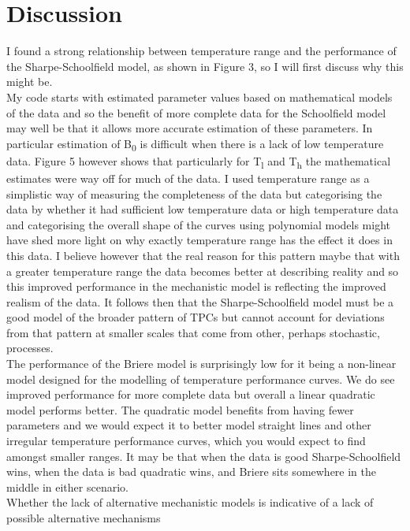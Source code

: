 \documentclass[fontsize=11pt]{scrartcl}\usepackage[]{graphicx}\usepackage[]{color}
\begin{document}
  \section{Discussion}

  I found a strong relationship between temperature range and the performance of the Sharpe-Schoolfield model, 
  as shown in Figure 3, so I will first discuss why this might be. \\
  My code starts with estimated parameter values based on mathematical models of the data and 
  so the benefit of more complete data for the Schoolfield model may well be that it allows more 
  accurate estimation of these parameters. In particular estimation of B\textsubscript{0} is 
  difficult when there is a lack of low temperature data.  Figure 5 however shows that particularly for T\textsubscript{l} 
  and T\textsubscript{h} the mathematical estimates were way off for much of the data. I used temperature range as a simplistic way of measuring
  the completeness of the data but categorising the data by whether it had sufficient low temperature data or high temperature data 
  and categorising the overall shape of the curves using polynomial models might have shed more light on why exactly temperature 
  range has the effect it does in this data. I believe however that the real reason for this pattern maybe that with a greater temperature
  range the data becomes better at describing reality and so this improved performance in the mechanistic model is reflecting the
  improved realism of the data. It follows then that the Sharpe-Schoolfield model must be a good model of the broader pattern of 
  TPCs but cannot account for deviations from that pattern at smaller scales that come from other, perhaps stochastic, processes. \\
  The performance of the Briere model is surprisingly low for it being a non-linear model designed
  for the modelling of temperature performance curves. We do see improved performance for more complete data but overall 
  a linear quadratic model performs better. The quadratic model benefits from having fewer parameters and 
  we would expect it to better model straight lines and other irregular temperature performance curves, 
  which you would expect to find amongst smaller ranges. 
  It may be that when the data is good Sharpe-Schoolfield wins, when the data is bad quadratic wins, 
  and Briere sits somewhere in the middle in either scenario.\\
  Whether the lack of alternative mechanistic models is indicative of a lack of possible alternative mechanisms 
\end{document}
